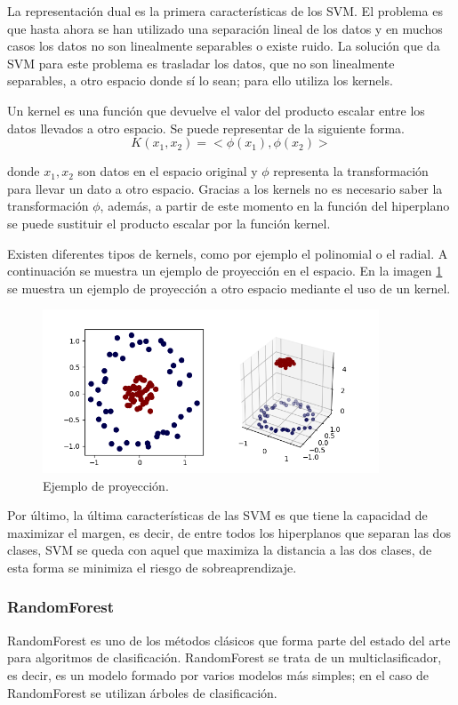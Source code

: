 La representación dual es la primera características de los SVM. El problema es que hasta ahora se han utilizado una separación lineal de los datos y en muchos casos los datos no son linealmente separables o existe ruido. La solución que da SVM para este problema es trasladar los datos, que no son linealmente separables, a otro espacio donde sí lo sean; para ello utiliza los kernels.\newline

Un kernel es una función que devuelve el valor del producto escalar entre los datos llevados a otro espacio. Se puede representar de la siguiente forma.
$$ K(x_1,x_2) = <\phi(x_1), \phi(x_2)> $$

\noindent donde $x_1, x_2$ son datos en el espacio original y $\phi$ representa la transformación para llevar un dato a otro espacio. Gracias a los kernels no es necesario saber la transformación $\phi$, además, a partir de este momento en la función del hiperplano se puede sustituir el producto escalar por la función kernel.\newline

Existen diferentes tipos de kernels, como por ejemplo el polinomial o el radial. A continuación se muestra un ejemplo de proyección en el espacio. En la imagen \ref{fig:215} se muestra un ejemplo de proyección a otro espacio mediante el uso de un kernel.\newline

\begin{figure}[h]
	\centering
	\includegraphics[width=100mm]{imagenes/svm_kernel_example.png}
	\caption{Ejemplo de proyección.}
	\label{fig:215}
\end{figure}
\newpage
Por último, la última características de las SVM es que tiene la capacidad
de maximizar el margen, es decir, de entre todos los hiperplanos que separan las dos clases, SVM se queda con aquel que maximiza la distancia a las dos clases, de esta forma se minimiza el riesgo de sobreaprendizaje.\newline

\subsubsection{RandomForest}
RandomForest \cite{breiman2001random} es uno de los métodos clásicos que forma parte del estado del arte para algoritmos de clasificación. RandomForest se trata de un multiclasificador, es decir, es un modelo formado por varios modelos más simples; en el caso de RandomForest se utilizan árboles de clasificación.\newline

